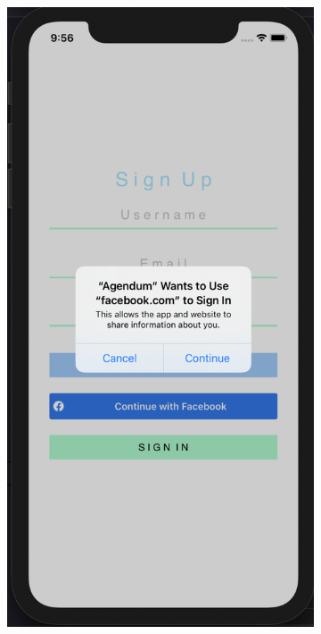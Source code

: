 \begin{figure}[H]
    \centering
    \begin{subfigure}[b]{0.3\textwidth}
        \centering
        \includegraphics[width=\textwidth]{./graphics/Implementation/Splash_Sign_Up_Sign_In/facebook1.png}

\end{subfigure}
\end{figure}
